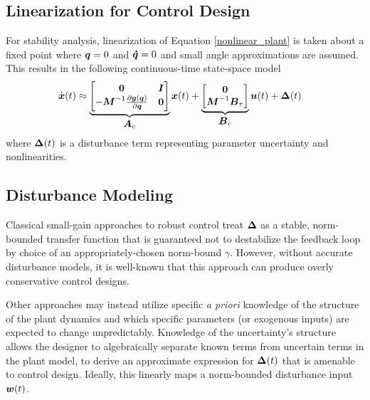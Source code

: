 \subsection{Linearization for Control Design}
For stability analysis, linearization of Equation \eqref{nonlinear_plant} is taken about a fixed point where $\vb*{q} = 0$ and $\vb*{\dot{q}} = 0$ and small angle approximations are assumed.  This results in the following continuous-time state-space model
\begin{equation}
\label{fixed_point_linearization1}
\begin{aligned}
	\dot{\vb*{x}}(t) &\approx
	\underbrace{
	\begin{bmatrix}
		\vb*{0} & \vb*{I}\\
		-\vb*{M}^{-1} \frac{\partial \vb*{g}(\vb*{q})}{\partial \vb*{q}} & \vb*{0}\\
	\end{bmatrix}}_{\text{\normalsize $\vb*{A}_{c}$}}
	\vb*{x}(t)
	 + 
	\underbrace{
	\begin{bmatrix}
		\vb*{0}\\
		\vb*{M}^{-1}\vb*{B}_{\tau}\\
	\end{bmatrix}}_{\text{\normalsize $\vb*{B}_{c}$}}
	\vb*{u}(t)
	 + 
	 \vb*{\Delta}(t)
\end{aligned}
\end{equation}
where $\vb*{\Delta}(t)$ is a disturbance term representing parameter uncertainty and nonlinearities.

\subsection{Disturbance Modeling}
\label{sect:disturbance_modeling}
Classical small-gain approaches to robust control treat $\vb*{\Delta}$ as a stable, norm-bounded transfer function that is guaranteed not to destabilize the feedback loop by choice of an appropriately-chosen norm-bound $\gamma$.  However, without accurate disturbance models, it is well-known that this approach can produce overly conservative control designs.

Other approaches may instead utilize specific \emph{a priori} knowledge of the structure of the plant dynamics and which specific parameters (or exogenous inputs) are expected to change unpredictably.  Knowledge of the uncertainty's structure allows the designer to algebraically separate known terms from uncertain terms in the plant model, to derive an approximate expression for $\vb*{\Delta}(t)$ that is amenable to control design.  Ideally, this linearly maps a norm-bounded disturbance input $\vb*{w}(t)$.

